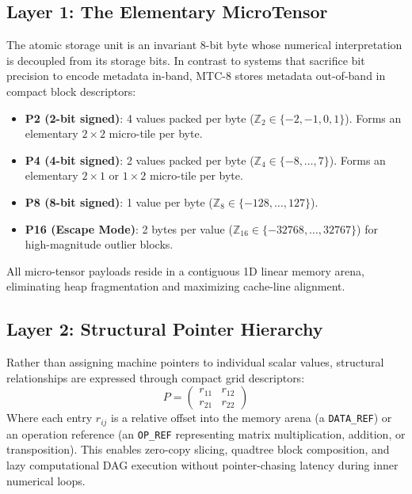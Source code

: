 \documentclass[11pt,a4paper]{article}
\begin{document}
\subsection{Layer 1: The Elementary MicroTensor}
The atomic storage unit is an invariant 8-bit byte whose numerical interpretation is decoupled from its storage bits. In contrast to systems that sacrifice bit precision to encode metadata in-band, MTC-8 stores metadata out-of-band in compact block descriptors:
\begin{itemize}
    \item \textbf{P2 (2-bit signed)}: 4 values packed per byte ($\mathbb{Z}_2 \in \{-2, -1, 0, 1\}$). Forms an elementary $2\times 2$ micro-tile per byte.
    \item \textbf{P4 (4-bit signed)}: 2 values packed per byte ($\mathbb{Z}_4 \in \{-8, \dots, 7\}$). Forms an elementary $2\times 1$ or $1\times 2$ micro-tile per byte.
    \item \textbf{P8 (8-bit signed)}: 1 value per byte ($\mathbb{Z}_8 \in \{-128, \dots, 127\}$).
    \item \textbf{P16 (Escape Mode)}: 2 bytes per value ($\mathbb{Z}_{16} \in \{-32768, \dots, 32767\}$) for high-magnitude outlier blocks.
\end{itemize}
All micro-tensor payloads reside in a contiguous 1D linear memory arena, eliminating heap fragmentation and maximizing cache-line alignment.

\subsection{Layer 2: Structural Pointer Hierarchy}
Rather than assigning machine pointers to individual scalar values, structural relationships are expressed through compact grid descriptors:
\begin{equation}
P = \begin{pmatrix} r_{11} & r_{12} \\ r_{21} & r_{22} \end{pmatrix}
\end{equation}
Where each entry $r_{ij}$ is a relative offset into the memory arena (a \texttt{DATA\_REF}) or an operation reference (an \texttt{OP\_REF} representing matrix multiplication, addition, or transposition). This enables zero-copy slicing, quadtree block composition, and lazy computational DAG execution without pointer-chasing latency during inner numerical loops.
\end{document}
